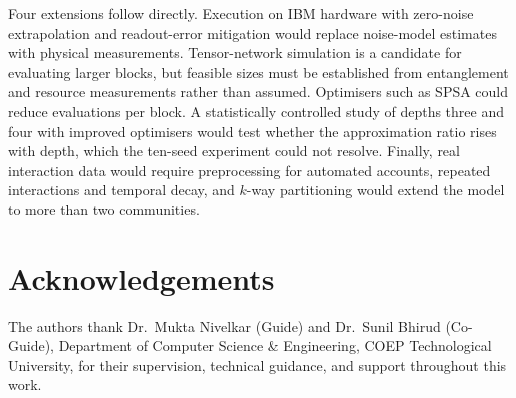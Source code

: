 \documentclass[pdflatex,sn-mathphys-num]{sn-jnl}
\theoremstyle{thmstyleone}
\theoremstyle{thmstyletwo}
\theoremstyle{thmstylethree}
\begin{document}
Four extensions follow directly. Execution on IBM hardware with zero-noise extrapolation and readout-error mitigation would replace noise-model estimates with physical measurements. Tensor-network simulation is a candidate for evaluating larger blocks, but feasible sizes must be established from entanglement and resource measurements rather than assumed. Optimisers such as SPSA could reduce evaluations per block. A statistically controlled study of depths three and four with improved optimisers would test whether the approximation ratio rises with depth, which the ten-seed experiment could not resolve. Finally, real interaction data would require preprocessing for automated accounts, repeated interactions and temporal decay, and $k$-way partitioning would extend the model to more than two communities.

\backmatter

\section*{Acknowledgements}
The authors thank Dr.~Mukta Nivelkar (Guide) and Dr.~Sunil Bhirud (Co-Guide), Department of Computer Science \& Engineering, COEP Technological University, for their supervision, technical guidance, and support throughout this work.

\end{document}
